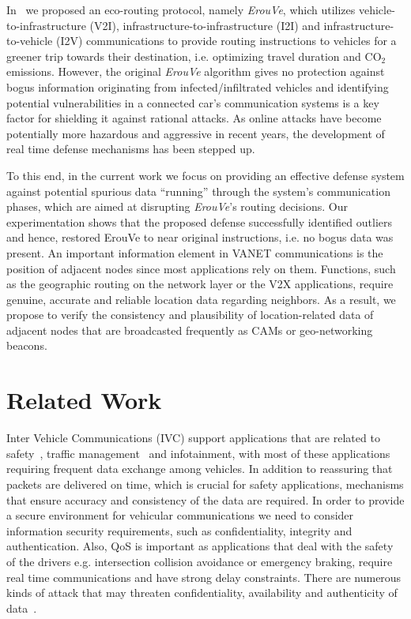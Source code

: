 \documentclass[conference]{IEEEtran}
\begin{document}
In~\cite{maglaras2013exploiting} we proposed an eco-routing protocol, namely {\it ErouVe}, which utilizes vehicle-to-infrastructure (V2I), infrastructure-to-infrastructure (I2I) and  infrastructure-to-vehicle (I2V) communications to provide routing instructions to vehicles for a greener trip towards their destination, i.e. optimizing travel duration and CO$_2$ emissions. However, the original {\it ErouVe} algorithm gives no protection against bogus information originating from infected/infiltrated vehicles and 
identifying potential vulnerabilities in a connected car's communication systems is a key factor for shielding it against rational attacks. As online attacks have become potentially more hazardous and aggressive in recent years,
the development of real time defense mechanisms has been stepped up.



To this end, in the current work we focus on providing an effective defense system against
potential spurious data ``running'' through the system's communication phases, which are aimed at disrupting {\it ErouVe}'s routing decisions. Our experimentation shows
that the proposed defense successfully identified outliers and hence, restored ErouVe to near original instructions, i.e. no bogus data was present.
An important information element in VANET communications is the position of adjacent nodes since most applications rely on them. Functions, such as the geographic
routing on the network layer or the V2X applications, require genuine, accurate and reliable location data
regarding neighbors. As a result, we propose to verify the consistency and plausibility of location-related
data of adjacent nodes that are broadcasted frequently as CAMs or geo-networking beacons.



\section{Related Work}

Inter Vehicle Communications (IVC) support applications that are related to safety~\cite{biswas2006vehicle}, traffic management~\cite{milojevic2014distributed} and infotainment, with most of these applications requiring frequent data exchange among vehicles. In addition to reassuring that packets are delivered on
time, which is crucial for safety applications, mechanisms that ensure accuracy and consistency of the data are required. In order to 
provide a secure environment for vehicular communications we need to consider information security requirements, such as confidentiality, integrity and authentication. Also, QoS is important as applications that deal with the safety of the drivers e.g. intersection collision avoidance or emergency braking, require real time communications and have strong delay constraints. 
There are numerous kinds of attack that may threaten confidentiality, availability and authenticity of data~\cite{maglaras2015}.
\end{document}
